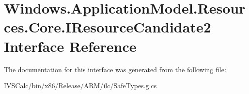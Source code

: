 \hypertarget{interface_windows_1_1_application_model_1_1_resources_1_1_core_1_1_i_resource_candidate2}{}\section{Windows.\+Application\+Model.\+Resources.\+Core.\+I\+Resource\+Candidate2 Interface Reference}
\label{interface_windows_1_1_application_model_1_1_resources_1_1_core_1_1_i_resource_candidate2}


The documentation for this interface was generated from the following file\+:\begin{DoxyCompactItemize}
\item 
I\+V\+S\+Calc/bin/x86/\+Release/\+A\+R\+M/ilc/Safe\+Types.\+g.\+cs\end{DoxyCompactItemize}
